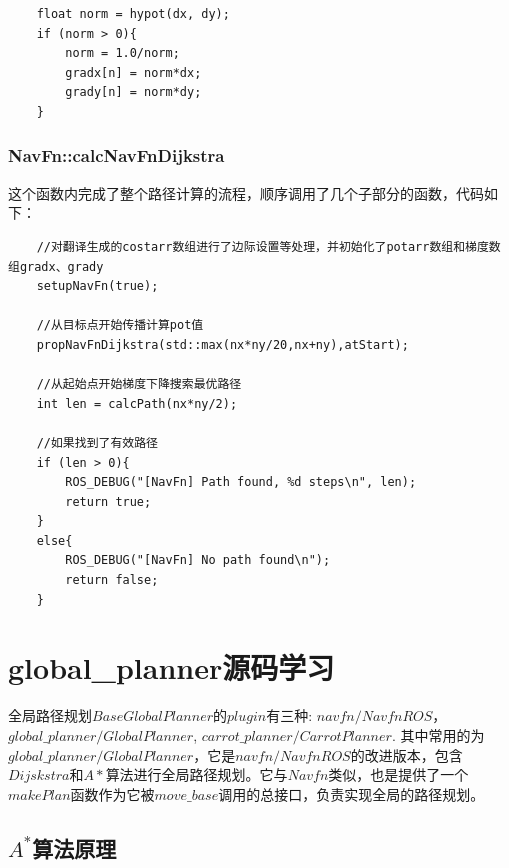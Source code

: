 \documentclass[9pt, oneside]{book}
\begin{document}
\small
\begin{verbatim}
    float norm = hypot(dx, dy);
    if (norm > 0){
        norm = 1.0/norm;
        gradx[n] = norm*dx;
        grady[n] = norm*dy;
    }
\end{verbatim}
\normalsize

\subsubsection{NavFn::calcNavFnDijkstra}

这个函数内完成了整个路径计算的流程，顺序调用了几个子部分的函数，代码如下：

\small
\begin{verbatim}
    //对翻译生成的costarr数组进行了边际设置等处理，并初始化了potarr数组和梯度数组gradx、grady
    setupNavFn(true);

    //从目标点开始传播计算pot值
    propNavFnDijkstra(std::max(nx*ny/20,nx+ny),atStart);

    //从起始点开始梯度下降搜索最优路径
    int len = calcPath(nx*ny/2);

    //如果找到了有效路径
    if (len > 0){
        ROS_DEBUG("[NavFn] Path found, %d steps\n", len);
        return true;
    }
    else{
        ROS_DEBUG("[NavFn] No path found\n");
        return false;
    }
\end{verbatim}
\normalsize

\section{global\_planner源码学习}

全局路径规划$BaseGlobalPlanner$的$plugin$有三种: $navfn/NavfnROS$，$global\_planner/GlobalPlanner$, $carrot\_planner/CarrotPlanner$. 其中常用的为$global\_planner/GlobalPlanner$，它是$navfn/NavfnROS$的改进版本，包含$Dijskstra$和$A*$算法进行全局路径规划。它与$Navfn$类似，也是提供了一个$makePlan$函数作为它被$move\_base$调用的总接口，负责实现全局的路径规划。


\subsection{$A^*$算法原理}

\end{document}
